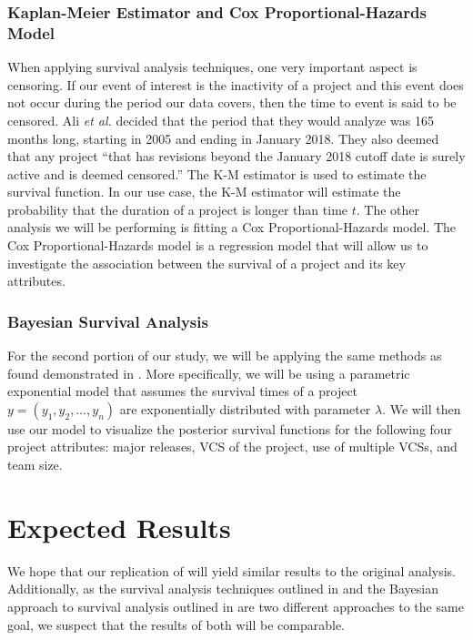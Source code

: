 \documentclass[conference]{IEEEtran}
\begin{document}
\subsubsection{Kaplan-Meier Estimator and Cox Proportional-Hazards Model}

When applying survival analysis techniques, one very important aspect is censoring. If our event of interest is the inactivity of a project and this event does not occur during the period our data covers, then the time to event is said to be censored. Ali \emph{et al.} decided that the period that they would analyze was 165 months long, starting in 2005 and ending in January 2018. They also deemed that any project ``that has revisions beyond the January 2018 cutoff date is surely active and is deemed censored.'' \cite{ali2020cheating} The K-M estimator is used to estimate the survival function. In our use case, the K-M estimator will estimate the probability that the duration of a project is longer than time $t$. The other analysis we will be performing is fitting a Cox Proportional-Hazards model. The Cox Proportional-Hazards model is a regression model that will allow us to investigate the association between the survival of a project and its key attributes.

\subsubsection{Bayesian Survival Analysis}

For the second portion of our study, we will be applying the same methods as found demonstrated in \cite{kelter2020bayesian}. More specifically, we will be using a parametric exponential model that assumes the survival times of a project $y = (y_1, y_2, \dots, y_n)$ are exponentially distributed with parameter $\lambda$. We will then use our model to visualize the posterior survival functions for the following four project attributes: major releases, VCS of the project, use of multiple VCSs, and team size.

\section{Expected Results}

We hope that our replication of \cite{ali2020cheating} will yield similar results to the original analysis. Additionally, as the survival analysis techniques outlined in \cite{ali2020cheating} and the Bayesian approach to survival analysis outlined in \cite{kelter2020bayesian} are two different approaches to the same goal, we suspect that the results of both will be comparable.
\end{document}
